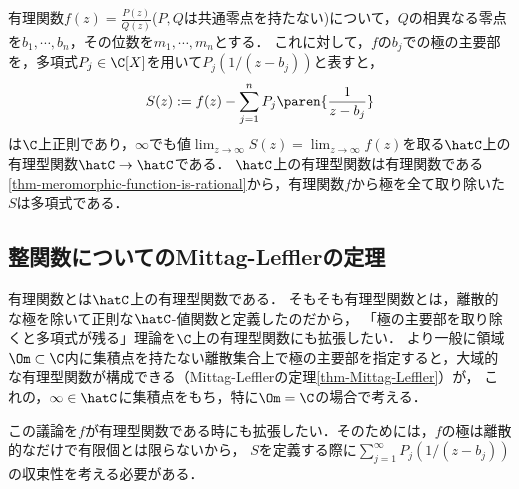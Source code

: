 \documentclass[uplatex, dvipdfmx]{jsreport}
\begin{document}
\begin{discussion}[有理関数から極の主要部を取り除くと多項式が残ることの証明]
    有理関数$f(z)=\frac{P(z)}{Q(z)}$($P,Q$は共通零点を持たない)について，$Q$の相異なる零点を$b_1,\cdots,b_n$，その位数を$m_1,\cdots,m_n$とする．
    これに対して，$f$の$b_j$での極の主要部を，多項式$P_j\in\C[X]$を用いて$P_j(1/(z-b_j))$と表すと，
    \[S(z):=f(z)-\sum^n_{j=1}P_j\paren{\frac{1}{z-b_j}}\]
    は$\C$上正則であり，$\infty$でも値$\lim_{z\to\infty}S(z)=\lim_{z\to\infty}f(z)$を取る$\hatC$上の有理型関数$\hatC\to\hatC$である．
    $\hatC$上の有理型関数は有理関数である\ref{thm-meromorphic-function-is-rational}から，有理関数$f$から極を全て取り除いた$S$は多項式である．
\end{discussion}

\subsection{整関数についてのMittag-Lefflerの定理}

\begin{tcolorbox}[colframe=ForestGreen, colback=ForestGreen!10!white,breakable,colbacktitle=ForestGreen!40!white,coltitle=black,fonttitle=\bfseries\sffamily,
title=]
    有理関数とは$\hatC$上の有理型関数である．
    そもそも有理型関数とは，離散的な極を除いて正則な$\hatC$-値関数と定義したのだから，
    「極の主要部を取り除くと多項式が残る」理論を$\C$上の有理型関数にも拡張したい．
    より一般に領域$\Om\subset\C$内に集積点を持たない離散集合上で極の主要部を指定すると，大域的な有理型関数が構成できる（Mittag-Lefflerの定理\ref{thm-Mittag-Leffler}）が，
    これの，$\infty\in\hatC$に集積点をもち，特に$\Om=\C$の場合で考える．
\end{tcolorbox}

\begin{screen}
    この議論を$f$が有理型関数である時にも拡張したい．そのためには，$f$の極は離散的なだけで有限個とは限らないから，
    $S$を定義する際に$\sum^\infty_{j=1}P_j(1/(z-b_j))$の収束性を考える必要がある．
\end{screen}
\end{document}
